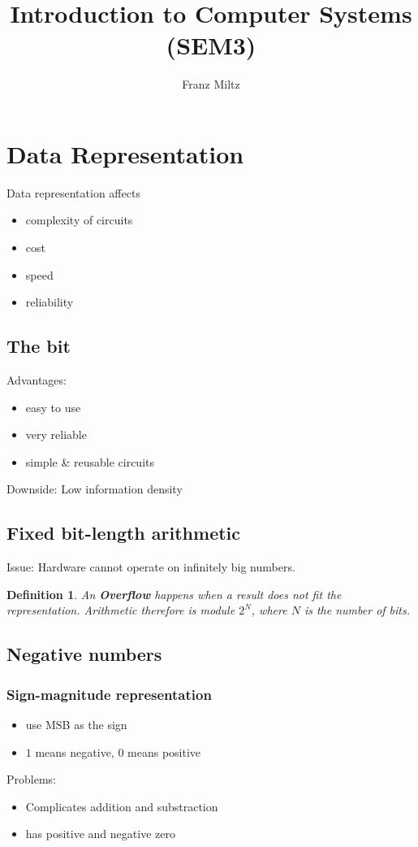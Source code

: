 \documentclass{article}
\theoremstyle{sltheorem}
\newtheorem{definition}{Definition}[section]
\begin{document}
\title{Introduction to Computer Systems (SEM3)}
\author{Franz Miltz}
\maketitle
\tableofcontents
\section{Data Representation}
Data representation affects
\begin{itemize}
	\item complexity of circuits
	\item cost
	\item speed 
	\item reliability
\end{itemize}
\subsection{The bit}
Advantages:
\begin{itemize}
	\item easy to use
	\item very reliable
	\item simple \& reusable circuits
\end{itemize}
Downside: Low information density
\subsection{Fixed bit-length arithmetic}
Issue: Hardware cannot operate on infinitely big numbers.
\begin{definition}
	An \textbf{Overflow} happens when a result does not fit the representation.
	Arithmetic therefore is module $2^N$, where $N$ is the number of bits.
\end{definition}
\subsection{Negative numbers}
\subsubsection{Sign-magnitude representation}
\begin{itemize}
	\item use MSB as the sign
	\item $1$ means negative, $0$ means positive
\end{itemize}
Problems: \begin{itemize}
	\item Complicates addition and substraction
	\item has positive and negative zero
\end{itemize}
\end{document}
